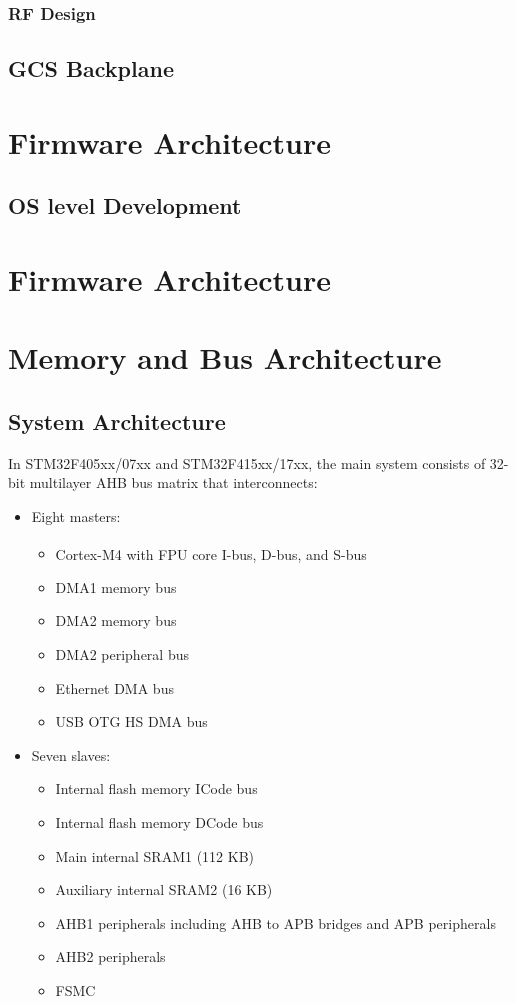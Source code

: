\subsubsection{RF Design}
\subsection{GCS Backplane}
\clearpage
\section{Firmware Architecture}
\subsection{OS level Development}


\clearpage

\section{Firmware Architecture}


\clearpage

\section{Memory and Bus Architecture}
\subsection{System Architecture}

In STM32F405xx/07xx and STM32F415xx/17xx, the main system consists of 32-bit 
multilayer AHB bus matrix that interconnects:
\begin{itemize}
    \item Eight masters:
    \begin{itemize}
        \item Cortex\textsuperscript{\textregistered}-M4 with FPU core I-bus, D-bus, and S-bus
        \item DMA1 memory bus
        \item DMA2 memory bus
        \item DMA2 peripheral bus
        \item Ethernet DMA bus
        \item USB OTG HS DMA bus
    \end{itemize}
    \item Seven slaves:
    \begin{itemize}
        \item Internal flash memory ICode bus
        \item Internal flash memory DCode bus
        \item Main internal SRAM1 (112 KB)
        \item Auxiliary internal SRAM2 (16 KB)
        \item AHB1 peripherals including AHB to APB bridges and APB peripherals
        \item AHB2 peripherals
        \item FSMC
    \end{itemize}
\end{itemize}

